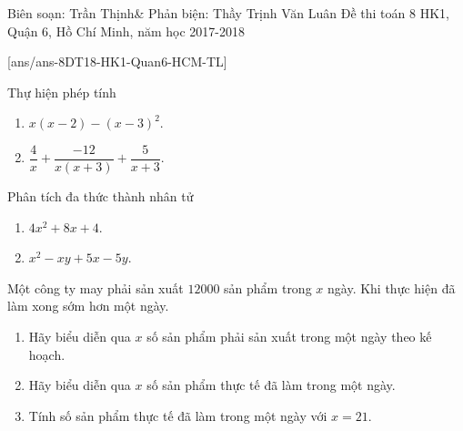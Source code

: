 \begin{name}
{Biên soạn: Trần Thịnh\& Phản biện: Thầy Trịnh Văn Luân}
{Đề thi toán 8 HK1, Quận 6, Hồ Chí Minh, năm học 2017-2018}
\end{name}
\setcounter{bt}{0}
[ans/ans-8DT18-HK1-Quan6-HCM-TL]
\begin{bt}%
	Thự hiện phép tính
	\begin{enumerate}
		\item $x(x-2)-(x-3)^2$.
		\item $\dfrac{4}{x}+\dfrac{-12}{x(x+3)}+\dfrac{5}{x+3}$.
	\end{enumerate}	
\end{bt}
\begin{bt}%
	Phân tích đa thức thành nhân tử
	\begin{enumerate}
		\item $4x^2+8x+4$.
		\item $x^2-xy+5x-5y$.
	\end{enumerate}	
\end{bt}
\begin{bt}%
	Một công ty may phải sản xuất $12 000$ sản phẩm trong $x$ ngày. Khi
	thực hiện đã làm xong sớm hơn một ngày.
	\begin{enumerate}
		\item Hãy biểu diễn qua $x$ số sản phẩm phải sản xuất trong một ngày theo kế hoạch.
		\item Hãy biểu diễn qua $x$ số sản phẩm thực tế đã làm trong một ngày.
		\item Tính số sản phẩm thực tế đã làm trong một ngày với $x = 21$.
	\end{enumerate}	
\end{bt}
